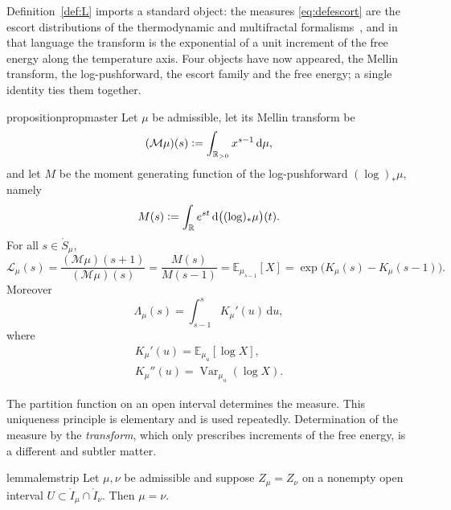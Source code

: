 \documentclass[sn-mathphys-num]{sn-jnl}
\theoremstyle{thmstyleone}%
\theoremstyle{thmstyletwo}%
\theoremstyle{thmstylethree}%
\theoremstyle{thmstyleone}%
\providecommand{\R}{\mathbb{R}}
\providecommand{\E}{\mathbb{E}}
\providecommand{\Var}{\operatorname{Var}}
\providecommand{\Rpos}{\mathbb{R}_{>0}}
\providecommand{\Leh}{\mathscr{L}}
\providecommand{\Mellin}{\mathcal{M}}
\providecommand{\dd}{\,\mathrm{d}}
\providecommand{\eqdef}{\mathrel{\vcentcolon=}}
\begin{document}
	Definition~\ref{def:L} imports a standard object: the measures
	\eqref{eq:defescort} are the escort distributions of the
	thermodynamic and multifractal
	formalisms~\cite{beck1993,halsey1986}, and in that language the
	transform is the exponential of a unit increment of the free energy
	along the temperature axis. Four objects have now appeared, the
	Mellin transform, the log-pushforward, the escort family and the
	free energy; a single identity ties them together.
	
	\begin{restatable}{proposition}{propmaster}\label{prop:master}
		Let $\mu$ be admissible, let its Mellin transform be
		\begin{equation}\label{eq:defmellin}
			(\Mellin\mu)(s)\eqdef\int_{\Rpos} x^{s-1}\dd\mu ,
		\end{equation}
		and let $M$ be the moment generating function of the
		log-pushforward $(\log)_*\mu$, namely
		\begin{equation}\label{eq:defmgf}
			M(s)\eqdef\int_{\R}e^{st}\dd\bigl((\log)_*\mu\bigr)(t).
		\end{equation}
		For all $s\in\mathring S_\mu$,
		\begin{equation}\label{eq:master}
			\Leh_\mu(s)
			=\frac{(\Mellin\mu)(s+1)}{(\Mellin\mu)(s)}
			=\frac{M(s)}{M(s-1)}
			=\E_{\mu_{s-1}}[X]
			=\exp\bigl(K_\mu(s)-K_\mu(s-1)\bigr).
		\end{equation}
		Moreover
		\begin{equation}\label{eq:logL}
			\Lambda_\mu(s)=\int_{s-1}^{s}K_\mu'(u)\dd u ,
		\end{equation}
		where
		\begin{equation}\label{eq:Kderivs}
			\begin{gathered}
				K_\mu'(u)=\E_{\mu_u}[\log X],\\
				K_\mu''(u)=\Var_{\mu_u}(\log X).
			\end{gathered}
		\end{equation}
	\end{restatable}
	
	
	The partition function on an open interval determines the measure.
	This uniqueness principle is elementary and is used repeatedly.
	Determination of the measure by the \emph{transform}, which only
	prescribes increments of the free energy, is a different and
	subtler matter.
	
	\begin{restatable}{lemma}{lemstrip}\label{lem:strip}
		Let $\mu,\nu$ be admissible and suppose $Z_\mu=Z_\nu$ on a
		nonempty open interval
		$U\subset\mathring I_\mu\cap\mathring I_\nu$. Then $\mu=\nu$.
	\end{restatable}
	
\end{document}

